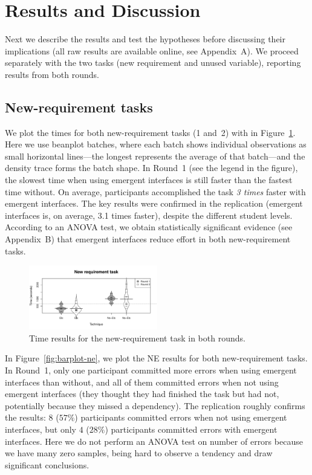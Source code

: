 
\section{Results and Discussion}

\label{sec:results}

Next we describe the results and test the hypotheses before discussing their implications (all raw results are available online, see Appendix~A). We proceed separately with the two tasks (new requirement and unused variable), reporting results from both rounds.

\subsection{New-requirement tasks}

We plot the times for both new-requirement tasks (1 and~2) with in Figure~\ref{fig:beanplots-nr}. Here we use beanplot batches, where each batch shows individual observations as small horizontal lines---the longest represents the average of that batch---and the density trace forms the batch shape. In Round~1 (see the legend in the figure), the slowest time when using emergent interfaces is still faster than the fastest time without. On average, participants accomplished the task \textit{3 times} faster with emergent interfaces. The key results were confirmed in the replication (emergent interfaces is, on average, 3.1 times faster), despite the different student levels. According to an ANOVA test, we obtain statistically significant evidence (see Appendix~B) that emergent interfaces reduce effort in both new-requirement tasks.

\begin{figure}[tp]
\centering
\includegraphics[width=0.5\textwidth]{images/Beanplots-NR.pdf}
\caption{Time results for the new-requirement task in both rounds.}
\label{fig:beanplots-nr}
\end{figure}

In Figure~\ref{fig:barplot-ne}, we plot the NE results for both new-requirement tasks. In Round~1, only one participant committed more errors when using emergent interfaces than without, and all of them committed errors when not using emergent interfaces (they thought they had finished the task but had not, potentially because they missed a dependency). The replication roughly confirms the results: $8$ ($57\%$) participants committed errors when not using emergent interfaces, but only $4$ ($28\%$) participants committed errors with emergent interfaces. Here we do not perform an ANOVA test on number of errors because we have many zero samples, being hard to observe a tendency and draw significant conclusions.

